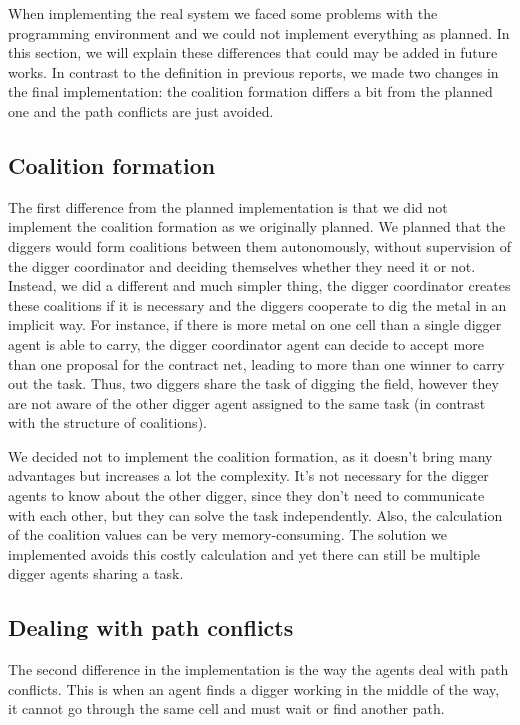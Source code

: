When implementing the real system we faced some problems with the programming environment and we could not implement everything as planned. In this section, we will explain these differences that could may be added in future works. In contrast to the definition in previous reports, we made two changes in the final implementation: the coalition formation differs a bit from the planned one and the path conflicts are just avoided. 

\subsection{Coalition formation}

The first difference from the planned implementation is that we did not implement the coalition formation as we originally planned. We planned that the diggers would form coalitions between them autonomously, without supervision of the digger coordinator and deciding themselves whether they need it or not. Instead, we did a different and much simpler thing, the digger coordinator creates these coalitions if it is necessary and the diggers cooperate to dig the metal in an implicit way.  For instance, if there is more metal on one cell than a single digger agent is able to carry, the digger coordinator agent can decide to accept more than one proposal for the contract net, leading to more than one winner to carry out the task. Thus, two diggers share the task of digging the field, however they are not aware of the other digger agent assigned to the same task (in contrast with the structure of coalitions).

We decided not to implement the coalition formation, as it doesn't bring many advantages but increases a lot the complexity.  It's not necessary for the digger agents to know about the other digger, since they don't need to communicate with each other, but they can solve the task independently. Also, the calculation of the coalition values can be very memory-consuming. The solution we implemented avoids this costly calculation and yet there can still be multiple digger agents sharing a task.

\subsection{Dealing with path conflicts}

The second difference in the implementation is the way the agents deal with path conflicts. This is when an agent finds a digger working in the middle of the way, it cannot go through the same cell and must wait or find another path. 

